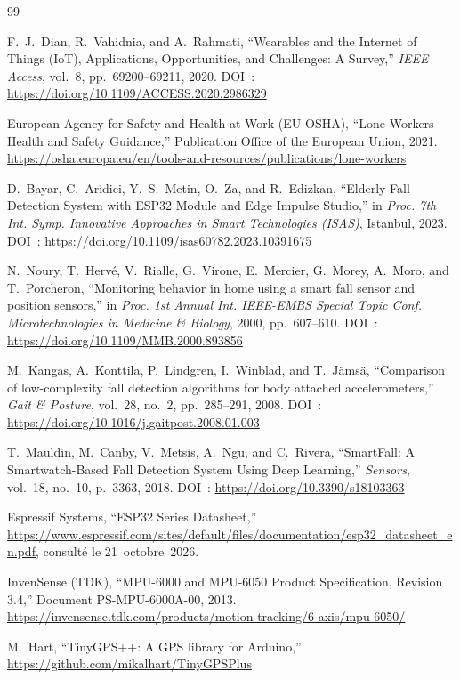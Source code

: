 \documentclass[12pt,a4paper]{article}
\renewcommand{\_}{\textunderscore\allowbreak}
\begin{document}
\newpage
\begin{thebibliography}{99}

F.~J.~Dian, R.~Vahidnia, and A.~Rahmati,
``Wearables and the Internet of Things (IoT), Applications, Opportunities, and Challenges: A Survey,''
\textit{IEEE Access}, vol.~8, pp.~69200--69211, 2020.
DOI~: \url{https://doi.org/10.1109/ACCESS.2020.2986329}

European Agency for Safety and Health at Work (EU-OSHA),
``Lone Workers --- Health and Safety Guidance,''
Publication Office of the European Union, 2021.
\url{https://osha.europa.eu/en/tools-and-resources/publications/lone-workers}

D.~Bayar, C.~Aridici, Y.~S.~Metin, O.~Za, and R.~Edizkan,
``Elderly Fall Detection System with ESP32 Module and Edge Impulse Studio,''
in \textit{Proc. 7th Int. Symp. Innovative Approaches in Smart Technologies (ISAS)}, Istanbul, 2023.
DOI~: \url{https://doi.org/10.1109/isas60782.2023.10391675}

N.~Noury, T.~Hervé, V.~Rialle, G.~Virone, E.~Mercier, G.~Morey, A.~Moro, and T.~Porcheron,
``Monitoring behavior in home using a smart fall sensor and position sensors,''
in \textit{Proc. 1st Annual Int. IEEE-EMBS Special Topic Conf. Microtechnologies in Medicine \& Biology}, 2000, pp.~607--610.
DOI~: \url{https://doi.org/10.1109/MMB.2000.893856}

M.~Kangas, A.~Konttila, P.~Lindgren, I.~Winblad, and T.~Jämsä,
``Comparison of low-complexity fall detection algorithms for body attached accelerometers,''
\textit{Gait \& Posture}, vol.~28, no.~2, pp.~285--291, 2008.
DOI~: \url{https://doi.org/10.1016/j.gaitpost.2008.01.003}

T.~Mauldin, M.~Canby, V.~Metsis, A.~Ngu, and C.~Rivera,
``SmartFall: A Smartwatch-Based Fall Detection System Using Deep Learning,''
\textit{Sensors}, vol.~18, no.~10, p.~3363, 2018.
DOI~: \url{https://doi.org/10.3390/s18103363}

Espressif Systems,
``ESP32 Series Datasheet,''
\url{https://www.espressif.com/sites/default/files/documentation/esp32_datasheet_en.pdf}, consulté le 21~octobre~2026.

InvenSense (TDK),
``MPU-6000 and MPU-6050 Product Specification, Revision 3.4,''
Document PS-MPU-6000A-00, 2013.
\url{https://invensense.tdk.com/products/motion-tracking/6-axis/mpu-6050/}

M.~Hart,
``TinyGPS++: A GPS library for Arduino,''
\url{https://github.com/mikalhart/TinyGPSPlus}

\end{thebibliography}
\end{document}
